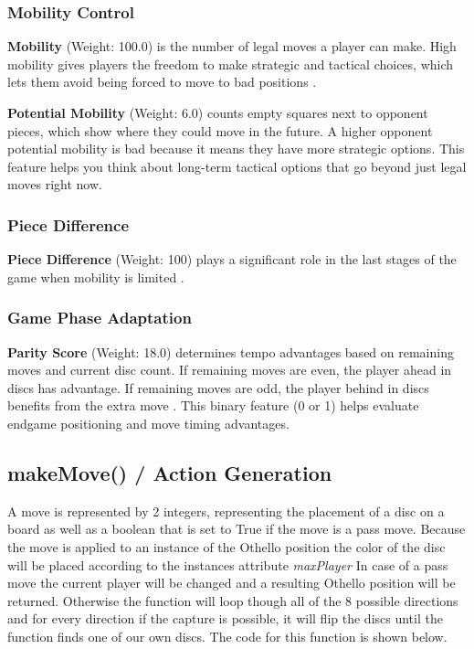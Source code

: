 \documentclass[10pt, titlepage, oneside, a4paper]{article}
\begin{document}
\subsubsection{Mobility Control}

\vspace{0.5em}

\textbf{Mobility} (Weight: 100.0) is the number of legal moves a player can make.  High mobility gives players the freedom to make strategic and tactical choices, which lets them avoid being forced to move to bad positions \cite{cohen2020learning}.

\textbf{Potential Mobility} (Weight: 6.0) counts empty squares next to opponent pieces, which show where they could move in the future.  A higher opponent potential mobility is bad because it means they have more strategic options\cite{buro1995othello}.  This feature helps you think about long-term tactical options that go beyond just legal moves right now.

\subsubsection{Piece Difference}

\vspace{0.5em}

\textbf{Piece Difference} (Weight: 100) plays a significant role in the last stages of the game when mobility is limited \cite{othello-heuristics-analysis}.

\subsubsection{Game Phase Adaptation}

\vspace{0.5em}
\textbf{Parity Score} (Weight: 18.0) determines tempo advantages based on remaining moves and current disc count. If remaining moves are even, the player ahead in discs has advantage. If remaining moves are odd, the player behind in discs benefits from the extra move \cite{brianothello2005}. This binary feature (0 or 1) helps evaluate endgame positioning and move timing advantages.


\subsection{makeMove() / Action Generation}
A move is represented by 2 integers, representing the placement of a disc on a board as well as a boolean that is set to True if the move is a pass move. Because the move is applied to an instance of the Othello position the color of the disc will be placed according to the instances attribute \textit{maxPlayer}
In case of a pass move the current player will be changed and a resulting Othello position will be returned. Otherwise the function will loop though all of the 8 possible directions and for every direction if the capture is possible, it will flip the discs until the function finds one of our own discs. The code for this function is shown below.
\end{document}
